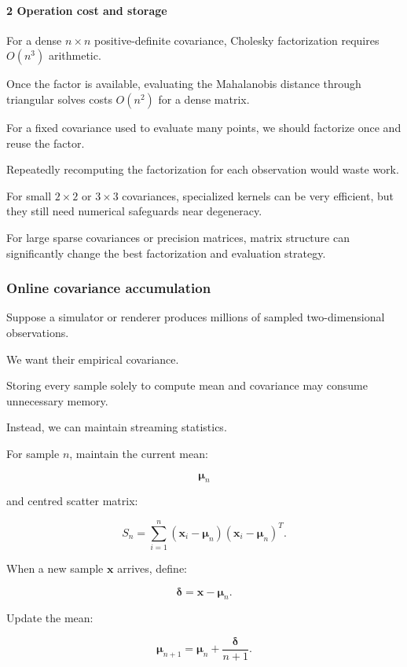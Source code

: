 \paragraph{2 Operation cost and storage}\label{operation-cost-and-storage}

For a dense \(n\times n\) positive-definite covariance, Cholesky factorization requires \(O(n^3)\) arithmetic.

Once the factor is available, evaluating the Mahalanobis distance through triangular solves costs \(O(n^2)\) for a dense matrix.

For a fixed covariance used to evaluate many points, we should factorize once and reuse the factor.

Repeatedly recomputing the factorization for each observation would waste work.

For small \(2\times2\) or \(3\times3\) covariances, specialized kernels can be very efficient, but they still need numerical safeguards near degeneracy.

For large sparse covariances or precision matrices, matrix structure can significantly change the best factorization and evaluation strategy.

\subsubsection{Online covariance accumulation}\label{online-covariance-accumulation}

Suppose a simulator or renderer produces millions of sampled two-dimensional observations.

We want their empirical covariance.

Storing every sample solely to compute mean and covariance may consume unnecessary memory.

Instead, we can maintain streaming statistics.

For sample \(n\), maintain the current mean:

\[
 \boldsymbol\mu_n
\]

and centred scatter matrix:

\[
 S_n= \sum_{i=1}^{n} (\mathbf x_i-\boldsymbol\mu_n) (\mathbf x_i-\boldsymbol\mu_n)^T.
\]

When a new sample \(\mathbf x\) arrives, define:

\[
 \boldsymbol\delta=\mathbf x-\boldsymbol\mu_n.
\]

Update the mean:

\[
 \boxed{ \boldsymbol\mu_{n+1} = \boldsymbol\mu_n+ \frac{\boldsymbol\delta}{n+1} }.
\]

